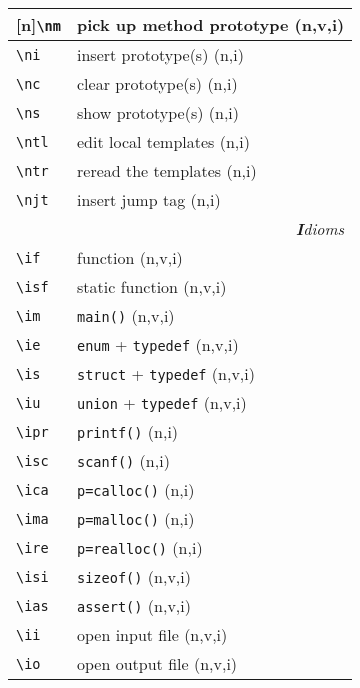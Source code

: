 \documentclass[oneside,11pt,landscape,DIV16]{scrartcl}
\newcommand{\Rep}{{\tiny{[n]}}}
\begin{document}
\begin{multicols}{3}
\begin{center}
\begin{tabular}[]{|p{11mm}|p{60mm}|}
\hline \Rep\verb'\nm'  & pick up method prototype  \hfill (n,v,i)\\
\hline     \verb'\ni'  & insert prototype(s)       \hfill (n,i)\\
\hline     \verb'\nc'  & clear  prototype(s)       \hfill (n,i)\\
\hline     \verb'\ns'  & show   prototype(s)       \hfill (n,i)\\
%
\hline     \verb'\ntl' & edit local templates      \hfill (n,i)\\
\hline     \verb'\ntr' & reread the templates      \hfill (n,i)\\
\hline     \verb'\njt' & insert jump tag           \hfill (n,i)\\
\hline
\hline 
\multicolumn{2}{|r|}{\textsl{\textbf{I}dioms}}   \\
\hline \verb'\if'  & function                           \hfill (n,v,i)\\
\hline \verb'\isf' & static function                    \hfill (n,v,i)\\
\hline \verb'\im'  & \verb'main()'                      \hfill (n,v,i)\\
\hline \verb'\ie'  & \verb'enum'   + \verb'typedef'     \hfill (n,v,i)\\
\hline \verb'\is'  & \verb'struct' + \verb'typedef'     \hfill (n,v,i)\\
\hline \verb'\iu'  & \verb'union'  + \verb'typedef'     \hfill (n,v,i)\\
\hline \verb'\ipr' & \verb'printf()'                    \hfill (n,i)\\
\hline \verb'\isc' & \verb'scanf()'                     \hfill (n,i)\\
\hline \verb'\ica' & \verb'p=calloc()'                  \hfill (n,i)\\
\hline \verb'\ima' & \verb'p=malloc()'                  \hfill (n,i)\\
\hline \verb'\ire' & \verb'p=realloc()'                 \hfill (n,i)\\
\hline \verb'\isi' & \verb'sizeof()'                    \hfill (n,v,i)\\
\hline \verb'\ias' & \verb'assert()'                    \hfill (n,v,i)\\
\hline \verb'\ii'  & open input file                    \hfill (n,v,i)\\
\hline \verb'\io'  & open output file                   \hfill (n,v,i)\\

\end{tabular}
\end{center}
\end{multicols}
\end{document}
